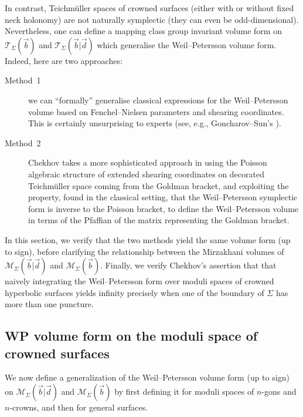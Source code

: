 \documentclass{amsart}
\theoremstyle{definition}
\begin{document}
In contrast, Teichm\"uller spaces of crowned surfaces (either with or without fixed neck holonomy) are not naturally symplectic (they can even be odd-dimensional). Nevertheless, one can define a mapping class group invariant volume form on $\mathcal{T}_\Sigma(\vec{b})$ and $\mathcal{T}_\Sigma(\vec{b}|\vec{d})$ which generalise the Weil--Petersson volume form. Indeed, here are two approaches:

\begin{description}
    \item[Method~1] we can ``formally'' generalise classical expressions for the Weil--Petersson volume based on Fenchel--Nielsen parameters and shearing coordinates. This is certainly unsurprising to experts (see, e.g., Goncharov--Sun's \cite[Lemma~2.8]{goncharovsun}).
    
    \item[Method~2] Chekhov takes a more sophisticated approach in \cite{chekhov2024} using the Poisson algebraic structure of extended shearing coordinates on decorated Teichm\"uller space coming from the Goldman bracket, and exploiting the property, found in the classical setting, that the Weil--Petersson symplectic form is inverse to the Poisson bracket, to define the Weil--Petersson volume in terms of the Pfaffian of the matrix representing the Goldman bracket. 
\end{description}

In this section, we verify that the two methods yield the same volume form (up to sign), before clarifying the relationship between the Mirzakhani volumes of $\mathcal{M}_{\Sigma}(\vec{b}|\vec{d})$ and $\mathcal{M}_{\Sigma}(\vec{b})$. Finally, we verify Chekhov's assertion that that naively integrating the Weil--Petersson form over moduli spaces of crowned hyperbolic surfaces yields infinity precisely when one of the boundary of $\Sigma$ has more than one puncture.






\subsection{WP volume form on the moduli space of crowned surfaces}

We now define a generalization of the Weil--Petersson volume form (up to sign) on $\mathcal{M}_{\Sigma}(\vec{b}|\vec{d})$ and $\mathcal{M}_{\Sigma}(\vec{b})$ by first defining it for moduli spaces of $n$-gons and $n$-crowns, and then for general surfaces.
\end{document}
